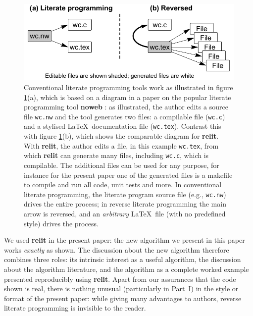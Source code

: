\documentclass[preprint,times]{elsarticle}
\def\new#1{#1}
\def\name#1{\textbf{#1}}
\begin{document}
\begin{figure}
\begin{center}
\noindent\includegraphics[width=4.9in]{figures/reversed.pdf}
\end{center}
\caption{\new{Conventional literate programming tools work as illustrated in figure \ref{fig:reversed}(a), which is based on a diagram in a paper on the popular literate programming tool \name{noweb} \cite{noweb}: as illustrated, the author edits a source file \texttt{wc.nw} and the tool generates two files: a compilable file (\texttt{wc.c}) and a stylised \LaTeX\ documentation file (\texttt{wc.tex}). Contrast this with figure \ref{fig:reversed}(b), which shows the comparable diagram for \name{relit}. With \name{relit}, the author edits a file, in this example \texttt{wc.tex}, from which \name{relit} can generate many files, including \texttt{wc.c}, which is compilable. The additional files can be used for any purpose, for instance for the present paper one of the generated files is a makefile to compile and run all code, unit tests and more. In conventional literate programming, the literate program source file (e.g., \texttt{wc.nw}) drives the entire process; in reverse literate programming the main arrow is reversed, and an \emph{arbitrary\/} \LaTeX\ file (with no predefined style) drives the process.}}
\label{fig:reversed}
\end{figure}

We used \name{relit} in the present paper: the new algorithm we present in this paper works \emph{exactly\/} as shown. The discussion about the new algorithm therefore combines three roles: its intrinsic interest as a useful algorithm, the discussion about the algorithm literature, and the algorithm as a complete worked example presented reproducibly using \name{relit}. \new{Apart from our assurances that the code shown is real, there is nothing unusual (particularly in Part~I) in the style or format of the present paper: while giving many advantages to authors, reverse literate programming is invisible to the reader.}
\end{document}
